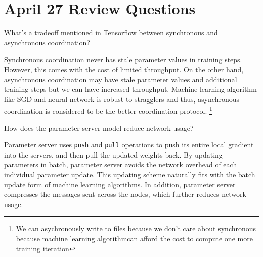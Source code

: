 \section{April 27 Review Questions}
\begin{QandA}
\item What's a tradeoff mentioned in Tensorflow between synchronous and asynchronous coordination?
\begin{answered}
Synchronous coordination never has stale parameter values in training steps. However, this comes with the cost of 
limited throughput. On the other hand, asynchronous coordination may have stale parameter values and additional training 
steps but we can have increased throughput. Machine learning algorithm like SGD and neural network is robust to stragglers
and thus, asynchronous coordination is considered to be the better coordination protocol.
\footnote{We can asychronously write to files because we don't care about synchronous because machine learning algorithmcan afford the cost to 
compute one more training iteration}
\end{answered}

\item How does the parameter server model reduce network usage?
\begin{answered}
Parameter server uses \texttt{push} and \texttt{pull} operations to push its entire local gradient into the servers, and
then pull the updated weights back. By updating parameters in batch, parameter server avoids the network overhead of each individual
parameter update. This updating scheme naturally fits with the batch update form of machine learning algorithms. In addition,
parameter server compresses the messages sent across the nodes, which further reduces network usage.
\end{answered}
\end{QandA}




